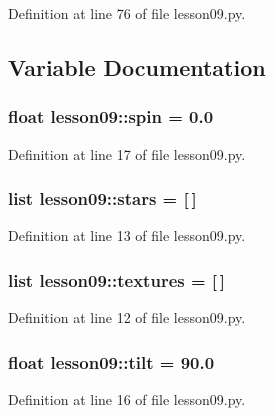 Definition at line 76 of file lesson09.py.

\subsection{Variable Documentation}
\subsubsection{\setlength{\rightskip}{0pt plus 5cm}float {\bf lesson09::spin} = 0.0\hspace{0.3cm}{\tt  [static]}}\label{namespacelesson09_a69440fdac2a35f399df191bc6742918}




Definition at line 17 of file lesson09.py.
\subsubsection{\setlength{\rightskip}{0pt plus 5cm}list {\bf lesson09::stars} = [$\,$]\hspace{0.3cm}{\tt  [static]}}\label{namespacelesson09_adab1974a94a1e733c7f91b6aad6d53f}




Definition at line 13 of file lesson09.py.
\subsubsection{\setlength{\rightskip}{0pt plus 5cm}list {\bf lesson09::textures} = [$\,$]\hspace{0.3cm}{\tt  [static]}}\label{namespacelesson09_3743acb56e5ae9dccc0016d6c5df3c0a}




Definition at line 12 of file lesson09.py.
\subsubsection{\setlength{\rightskip}{0pt plus 5cm}float {\bf lesson09::tilt} = 90.0\hspace{0.3cm}{\tt  [static]}}\label{namespacelesson09_c498c06116d7e5e22fe5eb3cfd3774b5}




Definition at line 16 of file lesson09.py.
